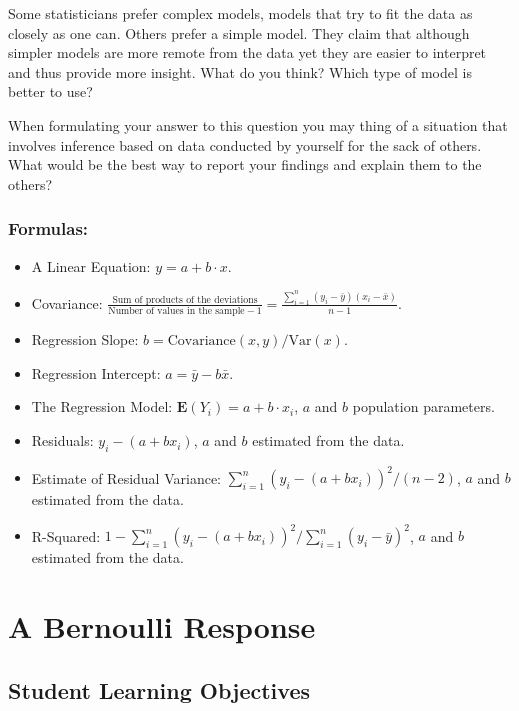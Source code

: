 \documentclass[]{krantz}
\newcommand{\Expec}{\mathbf{E}}
\theoremstyle{definition}
\theoremstyle{definition}
\theoremstyle{definition}
\theoremstyle{remark}
\begin{document}
Some statisticians prefer complex models, models that try to fit the
data as closely as one can. Others prefer a simple model. They claim
that although simpler models are more remote from the data yet they are
easier to interpret and thus provide more insight. What do you think?
Which type of model is better to use?

When formulating your answer to this question you may thing of a
situation that involves inference based on data conducted by yourself
for the sack of others. What would be the best way to report your
findings and explain them to the others?

\hypertarget{formulas}{%
\subsection*{Formulas:}\label{formulas}}


\begin{itemize}
\item
  A Linear Equation: \(y = a + b \cdot x\).
\item
  Covariance:
  \(\frac{\mbox{Sum of products of the deviations}}{\mbox{Number of values in the sample}-1} = \frac{\sum_{i=1}^n (y_i-\bar y)(x_i - \bar x)}{n-1}\).
\item
  Regression Slope: \(b = \mbox{Covariance}(x,y)/\mbox{Var}(x)\).
\item
  Regression Intercept: \(a = \bar y - b\bar x\).
\item
  The Regression Model: \(\Expec(Y_i) = a + b \cdot x_i\), \(a\) and \(b\)
  population parameters.
\item
  Residuals: \(y_i - (a + bx_i)\), \(a\) and \(b\) estimated from the data.
\item
  Estimate of Residual Variance:
  \(\sum_{i=1}^n(y_i - (a + bx_i))^2/(n-2)\), \(a\) and \(b\) estimated from
  the data.
\item
  R-Squared:
  \(1 - \sum_{i=1}^n(y_i - (a + bx_i))^2/\sum_{i=1}^n(y_i - \bar y)^2\),
  \(a\) and \(b\) estimated from the data.
\end{itemize}

\hypertarget{ChapLogistic}{%
\chapter{A Bernoulli Response}\label{ChapLogistic}}

\hypertarget{student-learning-objectives-9}{%
\section{Student Learning Objectives}\label{student-learning-objectives-9}}
\end{document}
